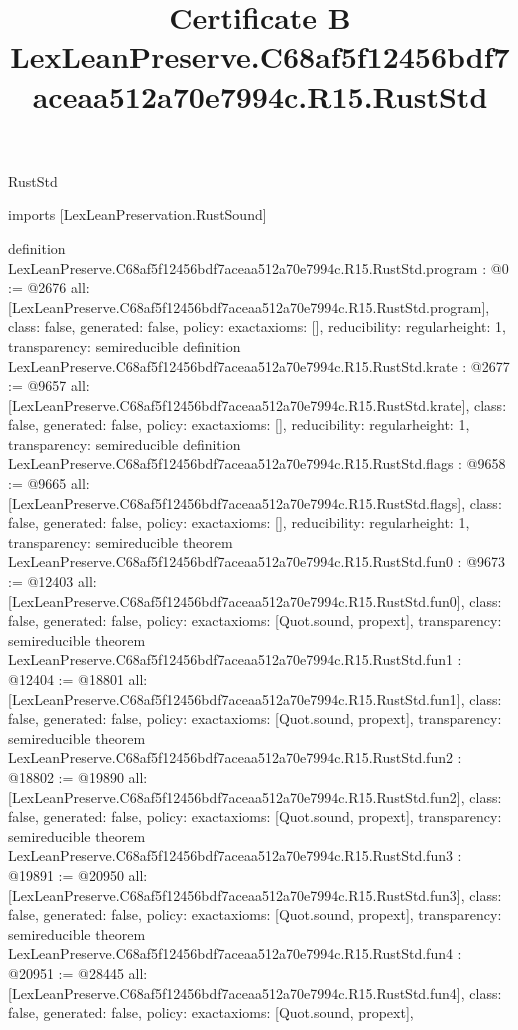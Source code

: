 \begin{lexlean}{RustStd}
\title{Certificate B LexLeanPreserve.C68af5f12456bdf7aceaa512a70e7994c.R15.RustStd}
\begin{coremodule}
imports [LexLeanPreservation.RustSound]

definition LexLeanPreserve.C68af5f12456bdf7aceaa512a70e7994c.R15.RustStd.program : @0 := @2676 {
  all: [LexLeanPreserve.C68af5f12456bdf7aceaa512a70e7994c.R15.RustStd.program],
  class: false,
  generated: false,
  policy: exact{axioms: []},
  reducibility: regular{height: 1},
  transparency: semireducible
}
definition LexLeanPreserve.C68af5f12456bdf7aceaa512a70e7994c.R15.RustStd.krate : @2677 := @9657 {
  all: [LexLeanPreserve.C68af5f12456bdf7aceaa512a70e7994c.R15.RustStd.krate],
  class: false,
  generated: false,
  policy: exact{axioms: []},
  reducibility: regular{height: 1},
  transparency: semireducible
}
definition LexLeanPreserve.C68af5f12456bdf7aceaa512a70e7994c.R15.RustStd.flags : @9658 := @9665 {
  all: [LexLeanPreserve.C68af5f12456bdf7aceaa512a70e7994c.R15.RustStd.flags],
  class: false,
  generated: false,
  policy: exact{axioms: []},
  reducibility: regular{height: 1},
  transparency: semireducible
}
theorem LexLeanPreserve.C68af5f12456bdf7aceaa512a70e7994c.R15.RustStd.fun0 : @9673 := @12403 {
  all: [LexLeanPreserve.C68af5f12456bdf7aceaa512a70e7994c.R15.RustStd.fun0],
  class: false,
  generated: false,
  policy: exact{axioms: [Quot.sound, propext]},
  transparency: semireducible
}
theorem LexLeanPreserve.C68af5f12456bdf7aceaa512a70e7994c.R15.RustStd.fun1 : @12404 := @18801 {
  all: [LexLeanPreserve.C68af5f12456bdf7aceaa512a70e7994c.R15.RustStd.fun1],
  class: false,
  generated: false,
  policy: exact{axioms: [Quot.sound, propext]},
  transparency: semireducible
}
theorem LexLeanPreserve.C68af5f12456bdf7aceaa512a70e7994c.R15.RustStd.fun2 : @18802 := @19890 {
  all: [LexLeanPreserve.C68af5f12456bdf7aceaa512a70e7994c.R15.RustStd.fun2],
  class: false,
  generated: false,
  policy: exact{axioms: [Quot.sound, propext]},
  transparency: semireducible
}
theorem LexLeanPreserve.C68af5f12456bdf7aceaa512a70e7994c.R15.RustStd.fun3 : @19891 := @20950 {
  all: [LexLeanPreserve.C68af5f12456bdf7aceaa512a70e7994c.R15.RustStd.fun3],
  class: false,
  generated: false,
  policy: exact{axioms: [Quot.sound, propext]},
  transparency: semireducible
}
theorem LexLeanPreserve.C68af5f12456bdf7aceaa512a70e7994c.R15.RustStd.fun4 : @20951 := @28445 {
  all: [LexLeanPreserve.C68af5f12456bdf7aceaa512a70e7994c.R15.RustStd.fun4],
  class: false,
  generated: false,
  policy: exact{axioms: [Quot.sound, propext]},
}
\end{coremodule}
\end{lexlean}
